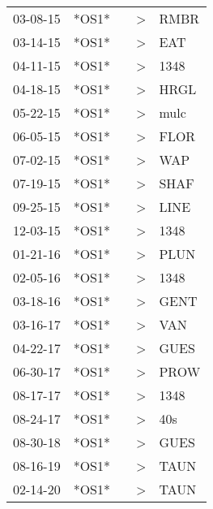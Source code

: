\begin{supertabular}{p{0.07\textwidth}p{0.06\textwidth}p{0.02\textwidth}p{0.02\textwidth}p{0.06\textwidth}}
 03-08-15\textsuperscript{} &  *OS1* &   &  \textgreater &  RMBR\textsuperscript{} \\
 03-14-15\textsuperscript{} &  *OS1* &   &  \textgreater &   EAT\textsuperscript{} \\
 04-11-15\textsuperscript{} &  *OS1* &   &  \textgreater &  1348\textsuperscript{} \\
 04-18-15\textsuperscript{} &  *OS1* &   &  \textgreater &  HRGL\textsuperscript{} \\
 05-22-15\textsuperscript{} &  *OS1* &   &  \textgreater &  mulc\textsuperscript{} \\
 06-05-15\textsuperscript{} &  *OS1* &   &  \textgreater &  FLOR\textsuperscript{} \\
 07-02-15\textsuperscript{} &  *OS1* &   &  \textgreater &   WAP\textsuperscript{} \\
 07-19-15\textsuperscript{} &  *OS1* &   &  \textgreater &  SHAF\textsuperscript{} \\
 09-25-15\textsuperscript{} &  *OS1* &   &  \textgreater &  LINE\textsuperscript{} \\
 12-03-15\textsuperscript{} &  *OS1* &   &  \textgreater &  1348\textsuperscript{} \\
 01-21-16\textsuperscript{} &  *OS1* &   &  \textgreater &  PLUN\textsuperscript{} \\
 02-05-16\textsuperscript{} &  *OS1* &   &  \textgreater &  1348\textsuperscript{} \\
 03-18-16\textsuperscript{} &  *OS1* &   &  \textgreater &  GENT\textsuperscript{} \\
 03-16-17\textsuperscript{} &  *OS1* &   &  \textgreater &   VAN\textsuperscript{} \\
 04-22-17\textsuperscript{} &  *OS1* &   &  \textgreater &  GUES\textsuperscript{} \\
 06-30-17\textsuperscript{} &  *OS1* &   &  \textgreater &  PROW\textsuperscript{} \\
 08-17-17\textsuperscript{} &  *OS1* &   &  \textgreater &  1348\textsuperscript{} \\
 08-24-17\textsuperscript{} &  *OS1* &   &  \textgreater &   40s\textsuperscript{} \\
 08-30-18\textsuperscript{} &  *OS1* &   &  \textgreater &  GUES\textsuperscript{} \\
 08-16-19\textsuperscript{} &  *OS1* &   &  \textgreater &  TAUN\textsuperscript{} \\
 02-14-20\textsuperscript{} &  *OS1* &   &  \textgreater &  TAUN\textsuperscript{} \\
\end{supertabular}
